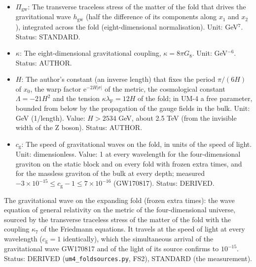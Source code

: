 \documentclass[
  10pt,
]{article}
\begin{document}
\begin{itemize}
  order in its curvature over \(H^2\) the fold obeys the Einstein
  equations of seven dimensions
  \(\hat G^a{}_b = \kappa_7\mathsf{t}^a{}_b\) with
  \(\kappa_7 = 5\kappa H/2\), the coupling of the massless graviton of
  the bulk bound to the fold; four-dimensional gravity on the fold has
  \(8\pi G_{\mathrm{N}} = \kappa_7/V_*\) (plus the induced term, which
  is negligible). Unit: GeV\(^{-5}\). Value: \(5\kappa H/2\). Status:
  DERIVED.
\item
  \(\Pi_{\mathrm{gw}}\): The transverse traceless stress of the matter
  of the fold that drives the gravitational wave \(h_{\mathrm{gw}}\)
  (half the difference of its components along \(x_1\) and \(x_2\)),
  integrated across the fold (eight-dimensional normalisation). Unit:
  GeV\(^7\). Status: STANDARD.
\item
  \(\kappa\): The eight-dimensional gravitational coupling,
  \(\kappa = 8\pi G_8\). Unit: GeV\(^{-6}\). Status: AUTHOR.
\item
  \(H\): The author's constant (an inverse length) that fixes the period
  \(\pi/(6H)\) of \(x_0\), the warp factor
  \(\mathrm{e}^{-2H\lvert\sigma\rvert}\) of the metric, the cosmological
  constant \(\Lambda = -21H^2\) and the tension
  \(\kappa\lambda_{\mathrm{F}} = 12H\) of the fold; in UM-4 a free
  parameter, bounded from below by the propagation of the gauge fields
  in the bulk. Unit: GeV (1/length). Value: \(H > 2534\) GeV, about 2.5
  TeV (from the invisible width of the Z boson). Status: AUTHOR.
\item
  \(c_{\mathrm{g}}\): The speed of gravitational waves on the fold, in
  units of the speed of light. Unit: dimensionless. Value: 1 at every
  wavelength for the four-dimensional graviton on the static block and
  on every fold with frozen extra times, and for the massless graviton
  of the bulk at every depth; measured
  \(-3\times10^{-15} \le c_{\mathrm{g}} - 1 \le 7\times10^{-16}\)
  (GW170817). Status: DERIVED.
\end{itemize}

The gravitational wave on the expanding fold (frozen extra times): the
wave equation of general relativity on the metric of the
four-dimensional universe, sourced by the transverse traceless stress of
the matter of the fold with the coupling \(\kappa_7\) of the Friedmann
equations. It travels at the speed of light at every wavelength
(\(c_{\mathrm{g}} = 1\) identically), which the simultaneous arrival of
the gravitational wave GW170817 and of the light of its source confirms
to \(10^{-15}\). Status: DERIVED (\texttt{um4\_foldsources.py}, FS2),
STANDARD (the measurement).
\end{document}
